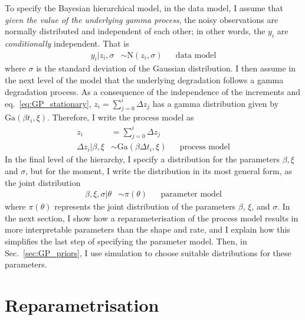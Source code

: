 To specify the Bayesian hierarchical model, in the data model, I assume that \emph{given the value of the underlying gamma process}, the noisy observations are normally distributed and independent of each other; in other words, the $y_i$ are \emph{conditionally} independent. That is
\begin{align*}
 y_i|z_i, \sigma & \sim \mbox{N}(z_i, \sigma)  && \mbox{data model}
\end{align*}
where $\sigma$ is the standard deviation of the Gaussian distribution. I then assume in the next level of the model that the underlying degradation follows a gamma degradation process. As a consequence of the independence of the increments and eq.~\eqref{eq:GP_stationary}, $z_i = \sum_{j = 0}^i \Delta z_j$ has a gamma distribution given by $\mbox{Ga}(\beta t_i, \xi)$. Therefore, I write the process model as
\begin{align*}
 z_i & = \sum_{j=0}^i \Delta z_j \\ 
 \Delta z_i | \beta, \xi & \sim \mbox{Ga}(\beta \Delta t_i, \xi) && \mbox{process model}
\end{align*}
In the final level of the hierarchy, I specify a distribution for the parameters $\beta, \xi$ and $\sigma$, but for the moment, I write the distribution in its most general form, as the joint distribution
\begin{align*}
 \beta, \xi, \sigma | \theta & \sim \pi(\theta) && \mbox{parameter model}
\end{align*}
where $\pi(\theta)$ represents the joint distribution of the parameters $\beta$, $\xi$, and $\sigma$. In the next section, I show how a reparameterisation of the process model results in more interpretable parameters than the shape and rate, and I explain how this simplifies the last step of specifying the parameter model. Then, in Sec.~\ref{sec:GP_priors}, I use simulation to choose suitable distributions for these parameters.

\section{Reparametrisation} \label{sec:GP-reparameterisation}

